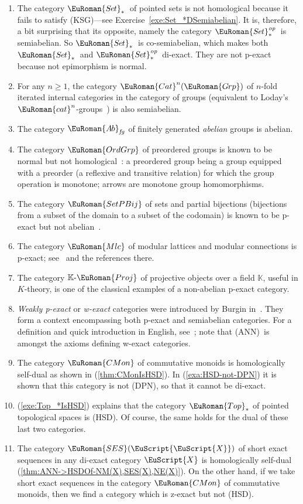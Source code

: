\documentclass [12pt,oneside]{book}%
\theoremstyle{captionstyle}  %
\newcommand{\SetsBsd}{\EuRoman{S{\kern-0.12ex}e{\hskip-0.14ex}t}_{\ast}\,}	%
\newcommand{\SetsBsdOp}{\EuRoman{S{\kern-0.12ex}e{\hskip-0.14ex}t}_{\ast}^{\op}\,}	%
\newcommand{\CMon}{\ensuremath{\EuRoman{CMon}}}
\newcommand{\Grps}{\EuRoman{G{\kern -.15ex}rp}}				%
\newcommand{\Mlc}{\ensuremath{\EuRoman{Mlc}}}
\newcommand{\KProj}{\text{$\mathbb{K}$-$\EuRoman{Proj}$}}
\newcommand{\TopsBsd}{\EuRoman{Top}_{\ast}}	%
\newcommand{\Cat}{\ensuremath{\EuRoman{Cat}}}
\newcommand{\cat}{\ensuremath{\EuRoman{cat}}}
\newcommand{\AbGrps}{\EuRoman{A{\kern-0.15ex}b}}	%
\newcommand{\OrdGrp}{\ensuremath{\EuRoman{OrdGrp}}}
\newcommand{\SetPBij}{\ensuremath{\EuRoman{SetPBij}}} %
\newcommand{\op}{\ensuremath{\mathit{op}}}
\newcommand{\Ctgry}[1]{\EuScript{#1}}					%
\newcommand{\SESCat}[1]{\EuRoman{SES}(\Ctgry{#1})}				%
\newcommand{\HSDInline}{(HSD)}																%
\newcommand{\DPNInline}{(DPN)}																%
\newcommand{\ANNInline}{(ANN)}																%
\newcommand{\KSGInline}{(KSG)}																%
\begin{document}
\begin{enumerate}
    \item The category $\SetsBsd$ of pointed sets is not homological because it fails to satisfy \KSGInline---see Exercise~\ref{exe:Set_*DSemiabelian}. It is, therefore, a bit surprising that its opposite, namely the category $\SetsBsdOp$ is semiabelian. So $\SetsBsd$ is co-semiabelian, which makes both $\SetsBsd$ and $\SetsBsdOp$ di-exact. They are not p-exact because not epimorphism is normal.
    \item For any $n\geq 1$, the category $\Cat^n(\Grps)$ of $n$-fold iterated internal categories in the category of groups (equivalent to Loday's $\cat^n$-groups~\cite{Loday}) is also semiabelian.
    \item The category $\AbGrps_{\mathit{fg}}$ of finitely generated \emph{abelian} groups is abelian.
    \item The category $\OrdGrp$ of preordered groups is known to be normal but not homological~\cite{MR3958089}: a preordered group being a group equipped with a preorder (a reflexive and transitive relation) for which the group operation is monotone; arrows are monotone group homomorphisms.
    \item The category $\SetPBij$ of sets and partial bijections (bijections from a subset of the domain to a subset of the codomain) is known to be p-exact but not abelian~\cite{Grandis-HA2}.
    \item The category $\Mlc$ of modular lattices and modular connections is p-exact; see~\cite{Borceux-Grandis} and the references there.
    \item The category $\KProj$ of projective objects over a field $\mathbb{K}$, useful in $K$-theory, is one of the classical examples of a non-abelian p-exact category.
    \item \emph{Weakly p-exact} or \emph{w-exact} categories were introduced by Burgin in~\cite{MR0352198}. They form a context encompassing both p-exact and semiabelian categories. For a definition and quick introduction in English, see~\cite{Borceux-Grandis}; note that \ANNInline\ is amongst the axioms defining w-exact categories.
    \item The category $\CMon$ of commutative monoids is homologically self-dual as shown in (\ref{thm:CMonIsHSD}). In (\ref{exa:HSD-not-DPN}) it is shown that this category is not \DPNInline, so that it cannot be di-exact.
    \item (\ref{exe:Top_*IsHSD}) explains that the category $\TopsBsd$ of pointed topological spaces is \HSDInline. Of course, the same holds for the dual of these last two categories.
    \item The category $\SESCat{\Ctgry{X}}$ of short exact sequences in any di-exact category $\Ctgry{X}$ is homologically self-dual (\ref{thm:ANN->HSDOf-NM(X),SES(X),NE(X)}). On the other hand, if we take short exact sequences in the category $\CMon$ of commutative monoids, then we find a category which is z-exact but not \HSDInline.
\end{enumerate}
\end{document}

